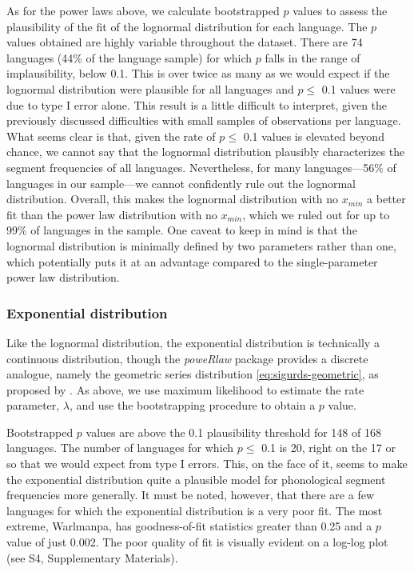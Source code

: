 As for the power laws above, we calculate bootstrapped \(p\) values to assess the plausibility of the fit of the lognormal distribution for each language. The \(p\) values obtained are highly variable throughout the dataset. There are 74 languages (44\% of the language sample) for which \(p\) falls in the range of implausibility, below 0.1. This is over twice as many as we would expect if the lognormal distribution were plausible for all languages and \(p \leq\) 0.1 values were due to type I error alone. This result is a little difficult to interpret, given the previously discussed difficulties with small samples of observations per language. What seems clear is that, given the rate of \(p \leq\) 0.1 values is elevated beyond chance, we cannot say that the lognormal distribution plausibly characterizes the segment frequencies of all languages. Nevertheless, for many languages---56\% of languages in our sample---we cannot confidently rule out the lognormal distribution. Overall, this makes the lognormal distribution with no \(x_{min}\) a better fit than the power law distribution with no \(x_{min}\), which we ruled out for up to 99\% of languages in the sample. One caveat to keep in mind is that the lognormal distribution is minimally defined by two parameters rather than one, which potentially puts it at an advantage compared to the single-parameter power law distribution.

\hypertarget{exponential-distribution}{%
\subsubsection{Exponential distribution}\label{exponential-distribution}}

Like the lognormal distribution, the exponential distribution is technically a continuous distribution, though the \emph{poweRlaw} package provides a discrete analogue, namely the geometric series distribution \eqref{eq:sigurds-geometric}, as proposed by \textcite{sigurd_rank-frequency_1968}. As above, we use maximum likelihood to estimate the rate parameter, \(\lambda\), and use the bootstrapping procedure to obtain a \(p\) value.

Bootstrapped \(p\) values are above the 0.1 plausibility threshold for 148 of 168 languages. The number of languages for which \(p \leq\) 0.1 is 20, right on the 17 or so that we would expect from type I errors. This, on the face of it, seems to make the exponential distribution quite a plausible model for phonological segment frequencies more generally. It must be noted, however, that there are a few languages for which the exponential distribution is a very poor fit. The most extreme, Warlmanpa, has goodness-of-fit statistics greater than 0.25 and a \(p\) value of just 0.002. The poor quality of fit is visually evident on a log-log plot (see S4, Supplementary Materials).

